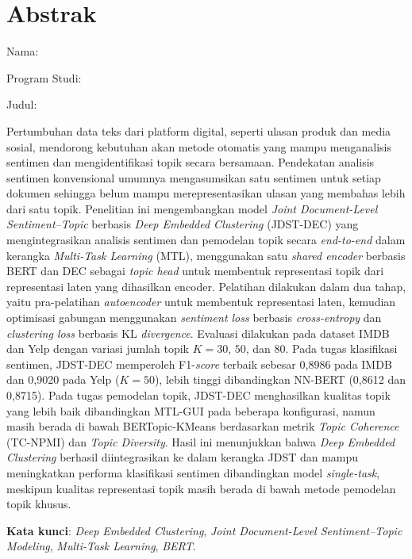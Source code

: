 \chapter*{Abstrak}
\vspace*{0.2cm}

{
\setlength{\parindent}{0pt}
\noindent
Nama: \penulis\par
Program Studi: \program\par
Judul: \judul\par
\medskip

\noindent
Pertumbuhan data teks dari platform digital, seperti ulasan produk dan media
sosial, mendorong kebutuhan akan metode otomatis yang mampu menganalisis
sentimen dan mengidentifikasi topik secara bersamaan. Pendekatan analisis
sentimen konvensional umumnya mengasumsikan satu sentimen untuk setiap
dokumen sehingga belum mampu merepresentasikan ulasan yang membahas lebih
dari satu topik. Penelitian ini mengembangkan model \textit{Joint
Document-Level Sentiment--Topic} berbasis \textit{Deep Embedded Clustering}
(JDST-DEC) yang mengintegrasikan analisis sentimen dan pemodelan topik
secara \textit{end-to-end} dalam kerangka \textit{Multi-Task Learning}
(MTL), menggunakan satu \textit{shared encoder} berbasis BERT dan DEC
sebagai \textit{topic head} untuk membentuk representasi topik dari
representasi laten yang dihasilkan encoder. Pelatihan dilakukan dalam dua
tahap, yaitu pra-pelatihan \textit{autoencoder} untuk membentuk representasi
laten, kemudian optimisasi gabungan menggunakan \textit{sentiment loss}
berbasis \textit{cross-entropy} dan \textit{clustering loss} berbasis KL
\textit{divergence}. Evaluasi dilakukan pada dataset IMDB dan Yelp dengan
variasi jumlah topik $K=30$, $50$, dan $80$. Pada tugas klasifikasi
sentimen, JDST-DEC memperoleh F1-\textit{score} terbaik sebesar 0{,}8986
pada IMDB dan 0{,}9020 pada Yelp ($K=50$), lebih tinggi dibandingkan
NN-BERT (0{,}8612 dan 0{,}8715). Pada tugas pemodelan topik, JDST-DEC
menghasilkan kualitas topik yang lebih baik dibandingkan MTL-GUI pada
beberapa konfigurasi, namun masih berada di bawah BERTopic-KMeans
berdasarkan metrik \textit{Topic Coherence} (TC-NPMI) dan \textit{Topic
Diversity}. Hasil ini menunjukkan bahwa \textit{Deep Embedded Clustering}
berhasil diintegrasikan ke dalam kerangka JDST dan mampu meningkatkan
performa klasifikasi sentimen dibandingkan model \textit{single-task},
meskipun kualitas representasi topik masih berada di bawah metode
pemodelan topik khusus.
\medskip

\noindent
\textbf{Kata kunci}: \textit{Deep Embedded Clustering},
\textit{Joint Document-Level Sentiment--Topic Modeling},
\textit{Multi-Task Learning}, \textit{BERT}.
}

\newpage
